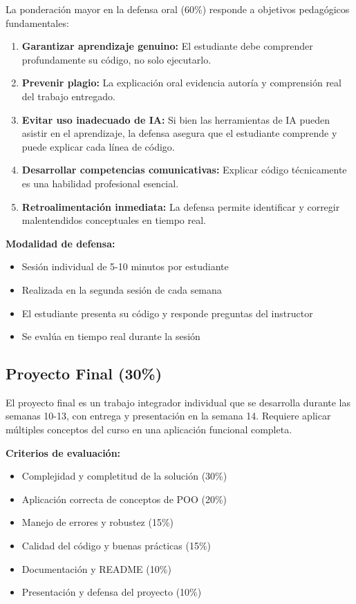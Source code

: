 \documentclass[12pt,letterpaper]{article}
\begin{document}
La ponderación mayor en la defensa oral (60\%) responde a objetivos pedagógicos fundamentales:

\begin{enumerate}[leftmargin=*]
    \item \textbf{Garantizar aprendizaje genuino:} El estudiante debe comprender profundamente su código, no solo ejecutarlo.
    
    \item \textbf{Prevenir plagio:} La explicación oral evidencia autoría y comprensión real del trabajo entregado.
    
    \item \textbf{Evitar uso inadecuado de IA:} Si bien las herramientas de IA pueden asistir en el aprendizaje, la defensa asegura que el estudiante comprende y puede explicar cada línea de código.
    
    \item \textbf{Desarrollar competencias comunicativas:} Explicar código técnicamente es una habilidad profesional esencial.
    
    \item \textbf{Retroalimentación inmediata:} La defensa permite identificar y corregir malentendidos conceptuales en tiempo real.
\end{enumerate}

\textbf{Modalidad de defensa:}
\begin{itemize}[leftmargin=*]
    \item Sesión individual de 5-10 minutos por estudiante
    \item Realizada en la segunda sesión de cada semana
    \item El estudiante presenta su código y responde preguntas del instructor
    \item Se evalúa en tiempo real durante la sesión
\end{itemize}

\subsection{Proyecto Final (30\%)}

El proyecto final es un trabajo integrador individual que se desarrolla durante las semanas 10-13, con entrega y presentación en la semana 14. Requiere aplicar múltiples conceptos del curso en una aplicación funcional completa.

\textbf{Criterios de evaluación:}
\begin{itemize}[leftmargin=*]
    \item Complejidad y completitud de la solución (30\%)
    \item Aplicación correcta de conceptos de POO (20\%)
    \item Manejo de errores y robustez (15\%)
    \item Calidad del código y buenas prácticas (15\%)
    \item Documentación y README (10\%)
    \item Presentación y defensa del proyecto (10\%)
\end{itemize}
\end{document}
